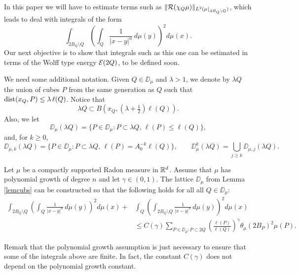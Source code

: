 In this paper we will have to estimate terms such as $\|{\mathcal R}(\chi_{Q}\mu)\|_{L^2(\mu{\lfloor}_{2B_Q\setminus Q})}$, 
which leads to deal with integrals of the form
$$\int_{2B_Q\setminus Q}\left(\int_Q \frac1{|x-y|^n}\,d\mu(y)\right)^2 d\mu(x).$$
Our next objective is to show that integrals such as this one can be estimated in terms of the Wolff type energy ${\mathcal E}(2Q)$, to be defined soon.

We need some additional notation.
Given $Q\in\DD_\mu$ and $\lambda>1$, we denote by $\lambda Q$ the union of cubes $P$ from the same
generation as $Q$ such that ${\rm dist}(x_Q,P)\leq \lambda \,\ell(Q)$. Notice that
\begin{equation}\label{eqlambq12}
	\lambda Q\subset B(x_Q,(\lambda+\tfrac12)\ell(Q)).
\end{equation}
Also, we let
$$\DD_\mu(\lambda Q)=\{P\in\DD_\mu:P\subset \lambda Q,\,\ell(P)\leq \ell(Q)\},$$
and, for $k\geq0$,
$$\DD_{\mu,k}(\lambda Q) =\{P\in\DD_\mu:P\subset \lambda Q,\,\ell(P)=A_0^{-k} \ell(Q)\},\qquad
\DD_\mu^k(\lambda Q) = \bigcup_{j\geq k} \DD_{\mu,j}(\lambda Q).
$$
\vv


\begin{lemma}\label{lemDMimproved}
	Let $\mu$ be a compactly supported Radon measure in ${\mathbb R}^{d}$.
	Assume that $\mu$ has polynomial growth of degree $n$ and let $\gamma\in(0,1)$. The lattice $\DD_\mu$ from Lemma
	\ref{lemcubs} can be constructed so that the following holds for all
	all $Q\in\DD_{\mu}$:
	\begin{align*}
		\int_{2B_Q\setminus Q}\left(\int_Q \frac1{|x-y|^n}\,d\mu(y)\right)^2 d\mu(x) 
		+ &\int_{Q}\left(\int_{2B_Q\setminus Q} \frac1{|x-y|^n}\,d\mu(y)\right)^2 d\mu(x)\\
		&\leq C(\gamma)\sum_{P\in\DD_\mu: P\subset 2Q} \left(\frac{\ell(P)}{\ell(Q)}\right)^\gamma\theta_\mu(2B_P)^2\mu(P).
	\end{align*}
\end{lemma}


Remark that the polynomial growth assumption is just necessary to ensure that some of the integrals above are finite. In fact, the constant $C(\gamma)$ does not depend on the polynomial growth constant. 

